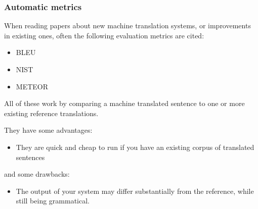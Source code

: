 \documentclass[10pt,xetex]{beamer} %
\begin{document}
\begin{frame}
  \frametitle{Automatic metrics}

When reading papers about new machine translation systems, or improvements 
in existing ones, often the following evaluation metrics are cited:

\begin{itemize}
  \item BLEU
  \item NIST
  \item METEOR
\end{itemize}

All of these work by comparing a machine translated sentence to one or more 
existing reference translations.

They have some advantages:

\begin{itemize}
  \item They are quick and cheap to run if you have an existing corpus
     of translated sentences
\end{itemize}

and some drawbacks:

\begin{itemize}
  \item The output of your system may differ substantially from the 
    reference, while still being grammatical.
\end{itemize}

\end{frame}
%
%
%
%
%
%
%
%

%
%
%
%
%
%
%
%
%
%
%
%
%
\end{document}
